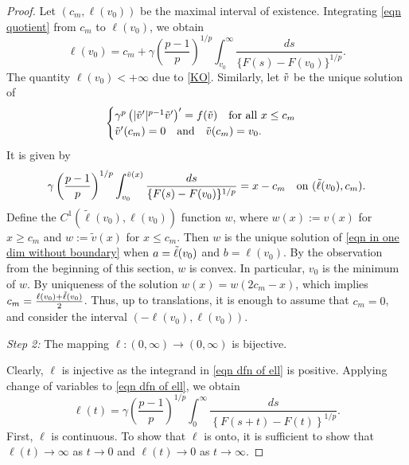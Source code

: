 \documentclass[11pt]{amsart}
\numberwithin{equation}{section}
\begin{document}
\begin{proof}
Let $(c_{m},\ell(v_{0}))$ be the maximal interval of existence. Integrating \eqref{eqn quotient} from $c_{m}$ to $\ell(v_{0})$, we obtain  
 \begin{equation}\label{eqn dfn of ell}
    \ell(v_{0})=c_{m}+ \gamma \left(\frac{p-1}{p}\right)^{1/p}\int_{v_{0}}^{\infty}\frac{ds}{\{F(s)-F(v_{0})\}^{1/p}}.
\end{equation}
The quantity $\ell(v_{0})<+\infty$ due to \ref{KO}.
Similarly, let $\Tilde{v}$ be the unique solution of
\begin{equation}\label{ODE2}
   \begin{cases}
     \gamma^{p}\left(|\Tilde{v}'|^{p-1}\Tilde{v}'\right)'=f(\Tilde{v})\quad \text{for all } x\leq c_{m}\\
     \Tilde{v}'(c_{m})=0 \quad \text{and} \quad \Tilde{v}(c_{m})=v_{0}.
 \end{cases} 
\end{equation}
It is given by 
\begin{equation}\label{eqn u2}
    \gamma \left(\frac{p-1}{p}\right)^{1/p}\int_{v_{0}}^{\Tilde{v}(x)}\frac{ds}{\{F(s)-F(v_{0})\}^{1/p}}=x-c_{m}\quad \text{on } (\Tilde{\ell}(v_{0}),c_{m}).
\end{equation}
Define the $C^{1}(\tilde{\ell}(v_{0}),\ell(v_{0}))$ function $w$, where $w(x):=v(x)$ for $x\geq c_{m}$ and $w:=\tilde{v}(x)$ for $x\leq c_{m}$. Then $w$ is the unique solution of \eqref{eqn in one dim without boundary} when $a=\Tilde{\ell}(v_{0})$ and $b =\ell(v_{0})$. By the observation from the beginning of this section, $w$ is convex. In particular, $v_{0}$ is the minimum of $w$.
By uniqueness of the solution $w(x)=w(2c_{m}-x)$, which implies $c_{m}=\frac{\ell(v_{0})+\Tilde{\ell}(v_{0})}{2}$. Thus, up to translations, it is enough to assume that $c_{m}=0$, and consider the interval $(-\ell(v_{0}),\ell(v_{0}))$.

  \textit{Step 2:} The mapping $\ell:(0,\infty)\to(0,\infty)$ is bijective.

Clearly, $\ell$ is injective as the integrand in \eqref{eqn dfn of ell} is positive. Applying change of variables to \eqref{eqn dfn of ell}, we obtain 
        \begin{equation*}
            \ell(t)=\gamma \left(\frac{p-1}{p}\right)^{1/p}\int_{0}^{\infty}\frac{ds}{\left\{F(s+t)-F(t)\right\}^{1/p}}.
        \end{equation*}
        First, $\ell$ is continuous. To show that $\ell$ is onto, it is sufficient to show that $\ell(t)\to \infty$ as $t\to 0$ and $\ell(t)\to 0$ as $t\to \infty$.


\end{proof}
\end{document}
